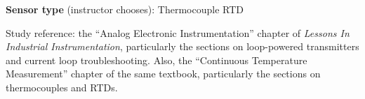 \vskip 10pt

\noindent
{\bf Sensor type} (instructor chooses): \hskip 20pt \underbar{\hskip 20pt} Thermocouple \hskip 20pt \underbar{\hskip 20pt} RTD

\vfil

Study reference: the ``Analog Electronic Instrumentation'' chapter of {\it Lessons In Industrial Instrumentation}, particularly the sections on loop-powered transmitters and current loop troubleshooting.  Also, the ``Continuous Temperature Measurement'' chapter of the same textbook, particularly the sections on thermocouples and RTDs.


















